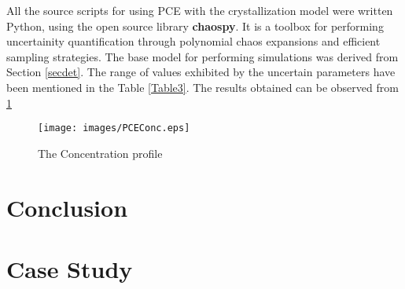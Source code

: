\documentclass[3p,times,authoryear]{elsarticle}
\begin{document}
All the source scripts for using PCE with the crystallization model were written Python, using the open source library \textbf{chaospy}\cite{chaospy}. It is a toolbox for performing uncertainity quantification through polynomial chaos expansions and efficient sampling strategies. The base model for performing simulations was derived from Section \ref{secdet}. The range of values exhibited by the uncertain parameters have been mentioned in the Table \ref{Table3}. The results obtained can be observed from \cref{PCEConc}






\begin{figure}[h!] 

\begin{center}
\texttt{[image: images/PCEConc.eps]} \label{PCEConc}
\end{center}
\caption{The Concentration profile}
\end{figure}


\section{Conclusion}

\section{Case Study}



\end{document}

